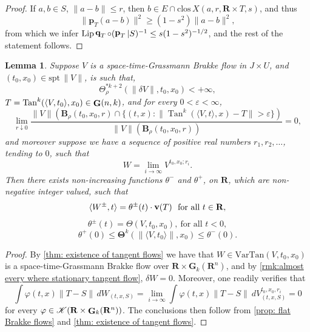 \documentclass{article}
\theoremstyle{plain}
\theoremstyle{definition}
\theoremstyle{plain}
\newtheorem{lemma}[theorem]{Lemma}
\theoremstyle{remark}
\theoremstyle{remark}
\theoremstyle{plain}
\DeclareMathOperator{\Tan}{Tan}
\DeclareMathOperator{\G}{{\bf G}}
\DeclareMathOperator{\Lip}{Lip}
\DeclareMathOperator{\vVarOp}{{\rm\bf v}}
\DeclareMathOperator{\bfp}{{\bf p}}
\DeclareMathOperator{\bfq}{{\bf q}}
\begin{document}
\begin{proof}
    If $a,b\in S$, $\|a-b\| \leq r$, then 
    $b \in E \cap \mathrm{clos} \, X(a,r, \mathbf{R} \times T,s)$, and thus 
    \[ \|\mathbf{p}_{T}(a-b)\|^2 \geq (1 - s^2) \|a-b\|^2,\]
    from which we infer $\Lip\bfq_{T} \circ (\bfp_{T}|S)^{-1} \leq s(1 - s^{2})^{-1/2}$, and the rest of the statement follows.
\end{proof}

\begin{lemma}\label{flat tangent flow lemma}
  Suppose $V$ is a space-time-Grassmann Brakke flow in $J\times U$, and $(t_{0}, x_{0}) \in \mathrm{spt} \, \| V \|$, is such that, 
  \begin{equation*}
      \Theta^{* k + 2}_{\rho} (\| \delta V \|, t_{0}, x_{0}) < + \infty, 
  \end{equation*}
  $T = \Tan^{k}(\langle V,t_{0}\rangle,x_{0}) \in \G(n,k)$, and for every $0<\varepsilon<\infty$,
  \[ \lim\limits_{r\downarrow 0} \frac{\|V\|(\mathbf B_{\rho}(t_{0}, x_{0}, r)\cap \{ (t, x) : \|\Tan^{k}(\langle V,t\rangle,x)-T\|>\varepsilon\})}{\|V\|(\mathbf B_{\rho}(t_{0}, x_{0}, r))} = 0,\]
  and moreover suppose we have a sequence of positive real numbers $r_1,r_2,\dots$, tending to $0$, such that
  \[ W = \lim\limits_{i\to\infty} V^{t_0,x_0;r_i}.\]
  Then 
  there exists non-increasing functions $\theta^{-}$ and $\theta^{+}$, on $\mathbf{R}$, which are non-negative integer valued, such that
  \[ \langle W^{\pm},t\rangle = \theta^{\pm}(t)\cdot \vVarOp (T) \ \text{ for all $t\in \mathbf R$},\] 
  \[  \theta^{\pm} (t) = \Theta(V,t_0,x_0), \ \text{for all $t<0$},\]
  \[  \theta^{+} (0) \leq \mathbf{\Theta}^{k} (\| \langle V, t_{0} \rangle \|, x_{0}) \leq \theta^{-} (0). \]
\end{lemma}

\begin{proof}
    By \ref{thm: existence of tangent flows} we have that $W \in \mathrm{VarTan} (V, t_{0}, x_{0})$ is a space-time-Grassmann Brakke flow over $\mathbf{R} \times \mathbf{G}_{k} (\mathbf{R}^{n})$, and by \ref{rmk:almost every where stationary tangent flow}, $\delta W = 0$.
    Moreover, one readily verifies that
  \begin{equation*}
    \textstyle \int \varphi (t, x) \| T - S \| \, d W_{(t, x, S)} = \textstyle  \lim\limits_{i\to\infty}\int \varphi(t,x) \| T-S \| \ d V^{t_0,x_0,r_i}_{(t,x,S)} = 0 
\end{equation*}
for every $\varphi \in \mathscr K( \mathbf R \times \G_k(\mathbf R^n))$. 
The conclusions then follow from \ref{prop: flat Brakke flows} and \ref{thm: existence of tangent flows}.
\end{proof}
\end{document}
